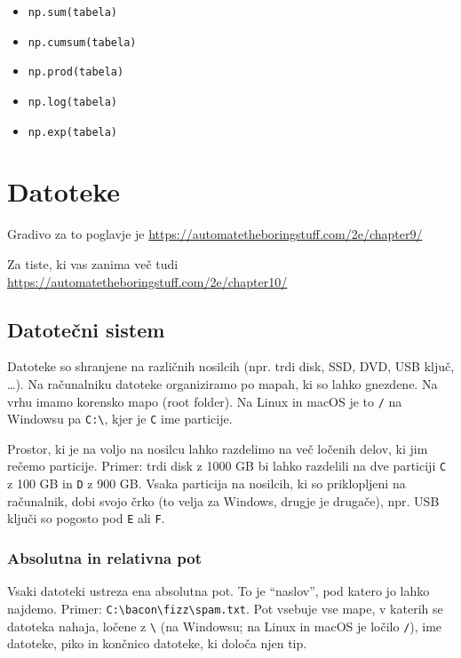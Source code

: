\documentclass[
]{book}
\providecommand{\tightlist}{%
  \setlength{\itemsep}{0pt}\setlength{\parskip}{0pt}}
\begin{document}
\begin{itemize}
\tightlist
\item
  \texttt{np.sum(tabela)}
\item
  \texttt{np.cumsum(tabela)}
\item
  \texttt{np.prod(tabela)}
\item
  \texttt{np.log(tabela)}
\item
  \texttt{np.exp(tabela)}
\end{itemize}

\hypertarget{datoteke}{%
\chapter{Datoteke}\label{datoteke}}

Gradivo za to poglavje je \url{https://automatetheboringstuff.com/2e/chapter9/}

Za tiste, ki vas zanima več tudi \url{https://automatetheboringstuff.com/2e/chapter10/}

\hypertarget{datoteux10dni-sistem}{%
\section{Datotečni sistem}\label{datoteux10dni-sistem}}

Datoteke so shranjene na različnih nosilcih (npr. trdi disk, SSD, DVD, USB ključ, \ldots).
Na računalniku datoteke organiziramo po mapah, ki so lahko gnezdene. Na vrhu
imamo korensko mapo (root folder). Na Linux in macOS je to \texttt{/} na Windowsu pa
\texttt{C:\textbackslash{}}, kjer je \texttt{C} ime particije.

Prostor, ki je na voljo na nosilcu lahko razdelimo
na več ločenih delov, ki jim rečemo particije. Primer: trdi disk z
1000 GB bi lahko razdelili na dve particiji \texttt{C} z 100 GB in \texttt{D} z 900 GB. Vsaka
particija na nosilcih, ki so priklopljeni na računalnik, dobi svojo črko
(to velja za Windows, drugje je drugače), npr.
USB ključi so pogosto pod \texttt{E} ali \texttt{F}.

\hypertarget{absolutna-in-relativna-pot}{%
\subsection{Absolutna in relativna pot}\label{absolutna-in-relativna-pot}}

Vsaki datoteki ustreza ena absolutna pot. To je ``naslov'', pod katero jo lahko najdemo.
Primer: \texttt{C:\textbackslash{}bacon\textbackslash{}fizz\textbackslash{}spam.txt}. Pot vsebuje vse mape, v katerih se datoteka
nahaja, ločene z \texttt{\textbackslash{}} (na Windowsu; na Linux in macOS je ločilo \texttt{/}), ime datoteke,
piko in končnico datoteke, ki določa njen tip.
\end{document}
